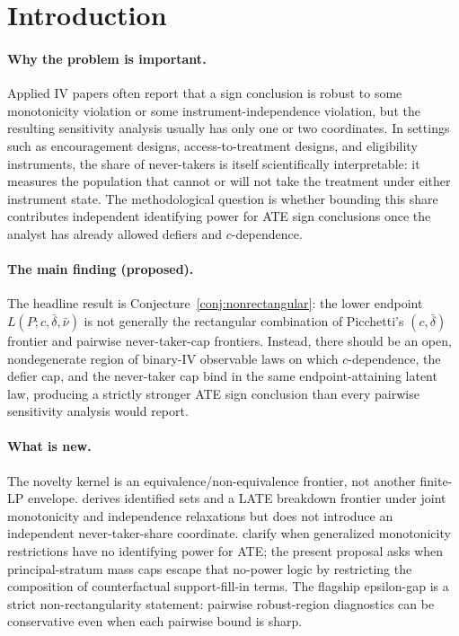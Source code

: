 \documentclass[11pt]{article}
\theoremstyle{definition}
\theoremstyle{plain}
\theoremstyle{remark}
\begin{document}
\section{Introduction}
\paragraph{Why the problem is important.}
Applied IV papers often report that a sign conclusion is robust to some
monotonicity violation or some instrument-independence violation, but the
resulting sensitivity analysis usually has only one or two coordinates.  In
settings such as encouragement designs, access-to-treatment designs, and
eligibility instruments, the share of never-takers is itself scientifically
interpretable: it measures the population that cannot or will not take the
treatment under either instrument state.  The methodological question is
whether bounding this share contributes independent identifying power for ATE
sign conclusions once the analyst has already allowed defiers and
\(c\)-dependence.

\paragraph{The main finding (proposed).}
The headline result is Conjecture~\ref{conj:nonrectangular}: the lower endpoint
\(L(P;c,\bar\delta,\bar\nu)\) is not generally the rectangular combination of
Picchetti's \((c,\bar\delta)\) frontier and pairwise never-taker-cap frontiers.
Instead, there should be an open, nondegenerate region of binary-IV observable
laws on which \(c\)-dependence, the defier cap, and the never-taker cap bind in
the same endpoint-attaining latent law, producing a strictly stronger ATE sign
conclusion than every pairwise sensitivity analysis would report.

\paragraph{What is new.}
The novelty kernel is an equivalence/non-equivalence frontier, not another
finite-LP envelope.  \citet{Picchetti2026} derives identified sets and a LATE
breakdown frontier under joint monotonicity and independence relaxations but
does not introduce an independent never-taker-share coordinate.
\citet{BaiHuangMoonShaikhVytlacil2024} clarify when generalized monotonicity
restrictions have no identifying power for ATE; the present proposal asks when
principal-stratum mass caps escape that no-power logic by restricting the
composition of counterfactual support-fill-in terms.  The flagship epsilon-gap
is a strict non-rectangularity statement: pairwise robust-region diagnostics
can be conservative even when each pairwise bound is sharp.
\end{document}
